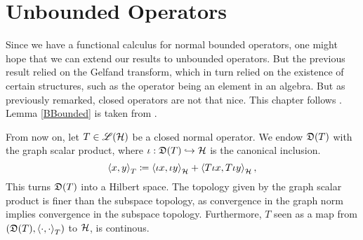 \section{Unbounded Operators}\label{section3}



Since we have a functional calculus for normal bounded operators, one might hope 
that we can extend our results to unbounded operators. But the previous 
result relied on the Gelfand transform, which in turn relied on the existence
of certain structures, such as the operator being an element in an algebra. 
But as previously remarked, closed operators are not that nice.
This chapter follows \cite{LesHaupt}. Lemma \ref{BBounded} is taken from 
\cite[p. 319]{ConFuncAna}.

From now on, let $T \in \mathscr{L}(\mathcal{H})$ be a closed normal operator. 
We endow $\mathfrak{D}(T)$ with the graph scalar product, where 
$\iota: \mathfrak{D}(T) \hookrightarrow \mathcal{H}$ is the canonical inclusion.
\[
 \left\langle x,y \right\rangle_T \coloneqq  \left\langle \iota x, \iota y \right\rangle_{\mathcal{H}} +
 \left\langle  T \iota x, T \iota y \right\rangle_{\mathcal{H}},
\]
This turns $\mathfrak{D}(T)$ into a Hilbert space. The topology given by the graph scalar product
is finer than the subspace topology, as convergence in the graph norm
 implies convergence in the subspace topology. Furthermore,
$T$ seen as a map from $( \mathfrak{D}(T) , \left\langle \cdot, \cdot \right\rangle_T)$ to $\mathcal{H}$, is 
continous.

